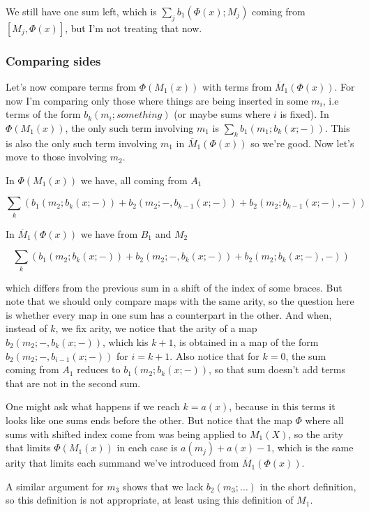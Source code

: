 \documentclass[twoside]{article}
\begin{document}
We still have one sum left, which is $\sum_j b_1(\Phi(x);M_j)$ coming from $[M_j,\Phi(x)]$, but I'm not treating that now.

\subsubsection{Comparing sides}
Let's now compare terms from $\Phi(M_1(x))$ with terms from $\overline{M}_1(\Phi(x))$. For now I'm comparing only  those where things are being inserted in some $m_i$, i.e terms of the form $b_k(m_i;something)$ (or maybe sums where $i$ is fixed). In $\Phi(M_1(x))$, the only such term involving $m_1$ is $\sum_k b_1(m_1;b_k(x;-))$. This is also the only such term involving $m_1$ in $\overline{M}_1(\Phi(x))$ so we're good. Now let's move to those involving $m_2$. 

In $\Phi(M_1(x))$ we have, all coming from $A_1$


$$\sum_k(b_1(m_2;b_k(x;-))+b_2(m_2;-,b_{k-1}(x;-))+b_2(m_2;b_{k-1}(x;-),-))$$

In $\overline{M}_1(\Phi(x))$ we have from $B_1$ and $M_2$

$$\sum_k (b_1(m_2;b_k(x;-))+b_2(m_2;-,b_{k}(x;-))+b_2(m_2;b_{k}(x;-),-))$$

which differs from the previous sum in a shift of the index of some braces. But note that we should only compare maps with the same arity, so the question here is whether every map in one sum has a counterpart in the other. And when, instead of $k$, we fix arity, we notice that the arity of a map $b_2(m_2;-,b_{k}(x;-))$, which kis $k+1$, is obtained in a map of the form $b_2(m_2;-,b_{i-1}(x;-))$ for $i=k+1$. Also notice that for $k=0$, the sum coming from $A_1$ reduces to $b_1(m_2;b_k(x;-))$, so that sum doesn't add terms that are not in the second sum. 

\begin{remark}
One might ask what happens if we reach $k=a(x)$, because in this terms it looks like one sums ends before the other. But notice that the map $\Phi$ where all sums with shifted index come from was being applied to $M_1(X)$, so the arity that limits $\Phi(M_1(x))$ in each case is $a(m_j)+a(x)-1$, which is the same arity that limits each summand we've introduced from $\overline{M}_1(\Phi(x))$. 
\end{remark}

A similar argument for $m_3$ shows that we lack $b_2(m_3;\dots)$ in the short definition, so this definition is not appropriate, at least using this definition of $M_1$.
\end{document}

